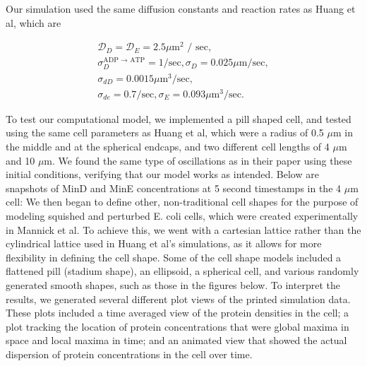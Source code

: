 \documentclass[letterpaper,twocolumn,amsmath,amssymb,pre]{revtex4-1}
\begin{document}
Our simulation used the same diffusion constants and reaction rates as
Huang et al, which are

\begin{gather*} %
  \mathcal{D}_D = \mathcal{D}_{E}  = 2.5 \mu \textrm{m$^2$ / sec}, \\
  \sigma_D^{\textrm{ADP $\rightarrow$ ATP}}  = 1/\textrm{sec},  \sigma_D = 0.025 \mu \textrm{m/sec}, \\
  \sigma_{dD}  = 0.0015 \mu \textrm{m$^3$/sec}, \\
  \sigma_{de}  = 0.7/\textrm{sec}, \sigma_E = 0.093 \mu \textrm{m$^3$/sec}.
\end{gather*}

To test our computational model, we implemented a pill shaped cell, and
tested using the same cell parameters as Huang et al, which were a radius
of 0.5 $\mu$m in the middle and at the spherical endcaps, and two different
cell lengths of 4 $\mu$m and 10 $\mu$m. We found the same type of
oscillations as in their paper using these initial conditions, verifying
that our model works as intended. Below are snapshots of MinD and MinE
concentrations at 5 second timestamps in the 4 $\mu$m cell:
\newline
{}
\newline
\newline
We then began to define other, non-traditional cell shapes for the purpose of
modeling squished and perturbed E. coli cells, which were created
experimentally in Mannick et al. To achieve this, we went with a
cartesian lattice rather than the cylindrical lattice used in Huang et
al's simulations, as it allows for more flexibility in defining the
cell shape. Some of the cell shape models included a flattened pill
(stadium shape), an ellipsoid, a spherical cell, and various randomly
generated smooth shapes, such as those in the figures below.
\newline
{}
\newline
\newline
To interpret the results, we generated several different plot views of
the printed simulation data. These plots included a time averaged view
of the protein densities in the cell; a plot tracking the location of
protein concentrations that were global maxima in space and local maxima in
time; and an animated view that showed the actual dispersion of
protein concentrations in the cell over time.
\end{document}
